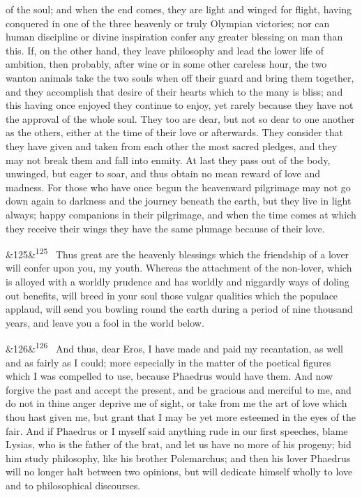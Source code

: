 \documentclass[12pt]{article}
\newcommand{\para}[1][]{\par\noindent\ifx&#1&\else\textsuperscript{\footnotesize #1}~\fi}
\begin{document}
of the soul; and when the end comes, they are light and winged for flight, having conquered in one of the three heavenly or truly Olympian victories; nor can human discipline or divine inspiration confer any greater blessing on man than this. If, on the other hand, they leave philosophy and lead the lower life of ambition, then probably, after wine or in some other careless hour, the two wanton animals take the two souls when off their guard and bring them together, and they accomplish that desire of their hearts which to the many is bliss; and this having once enjoyed they continue to enjoy, yet rarely because they have not the approval of the whole soul. They too are dear, but not so dear to one another as the others, either at the time of their love or afterwards. They consider that they have given and taken from each other the most sacred pledges, and they may not break them and fall into enmity. At last they pass out of the body, unwinged, but eager to soar, and thus obtain no mean reward of love and madness. For those who have once begun the heavenward pilgrimage may not go down again to darkness and the journey beneath the earth, but they live in light always; happy companions in their pilgrimage, and when the time comes at which they receive their wings they have the same plumage because of their love.

\para[125] Thus great are the heavenly blessings which the friendship of a lover will confer upon you, my youth. Whereas the attachment of the non-lover, which is alloyed with a worldly prudence and has worldly and niggardly ways of doling out benefits, will breed in your soul those vulgar qualities which the populace applaud, will send you bowling round the earth during a period of nine thousand years, and leave you a fool in the world below.

\para[126] And thus, dear Eros, I have made and paid my recantation, as well and as fairly as I could; more especially in the matter of the poetical figures which I was compelled to use, because Phaedrus would have them. And now forgive the past and accept the present, and be gracious and merciful to me, and do not in thine anger deprive me of sight, or take from me the art of love which thou hast given me, but grant that I may be yet more esteemed in the eyes of the fair. And if Phaedrus or I myself said anything rude in our first speeches, blame Lysias, who is the father of the brat, and let us have no more of his progeny; bid him study philosophy, like his brother Polemarchus; and then his lover Phaedrus will no longer halt between two opinions, but will dedicate himself wholly to love and to philosophical discourses.
\end{document}
